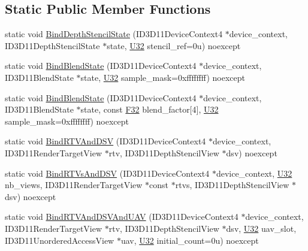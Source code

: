 \subsection*{Static Public Member Functions}
\begin{DoxyCompactItemize}
\item 
static void \hyperlink{structmage_1_1_pipeline_1_1_o_m_a03190c521a1f7b30d12dfdd9bc1ca933}{Bind\+Depth\+Stencil\+State} (I\+D3\+D11\+Device\+Context4 $\ast$device\+\_\+context, I\+D3\+D11\+Depth\+Stencil\+State $\ast$state, \hyperlink{namespacemage_a41c104c036fba3756a74e19f793eeaa1}{U32} stencil\+\_\+ref=0u) noexcept
\item 
static void \hyperlink{structmage_1_1_pipeline_1_1_o_m_a6f753f497555088423b58dea7689b031}{Bind\+Blend\+State} (I\+D3\+D11\+Device\+Context4 $\ast$device\+\_\+context, I\+D3\+D11\+Blend\+State $\ast$state, \hyperlink{namespacemage_a41c104c036fba3756a74e19f793eeaa1}{U32} sample\+\_\+mask=0xffffffff) noexcept
\item 
static void \hyperlink{structmage_1_1_pipeline_1_1_o_m_aec599ec22f8694479158597c5118435b}{Bind\+Blend\+State} (I\+D3\+D11\+Device\+Context4 $\ast$device\+\_\+context, I\+D3\+D11\+Blend\+State $\ast$state, const \hyperlink{namespacemage_aa97e833b45f06d60a0a9c4fc22ae02c0}{F32} blend\+\_\+factor\mbox{[}4\mbox{]}, \hyperlink{namespacemage_a41c104c036fba3756a74e19f793eeaa1}{U32} sample\+\_\+mask=0xffffffff) noexcept
\item 
static void \hyperlink{structmage_1_1_pipeline_1_1_o_m_a6f854210cf5d63f8e2b95c075edb65ed}{Bind\+R\+T\+V\+And\+D\+SV} (I\+D3\+D11\+Device\+Context4 $\ast$device\+\_\+context, I\+D3\+D11\+Render\+Target\+View $\ast$rtv, I\+D3\+D11\+Depth\+Stencil\+View $\ast$dsv) noexcept
\item 
static void \hyperlink{structmage_1_1_pipeline_1_1_o_m_a02b4ded0f2ead8684dc1986a63c613d6}{Bind\+R\+T\+Vs\+And\+D\+SV} (I\+D3\+D11\+Device\+Context4 $\ast$device\+\_\+context, \hyperlink{namespacemage_a41c104c036fba3756a74e19f793eeaa1}{U32} nb\+\_\+views, I\+D3\+D11\+Render\+Target\+View $\ast$const $\ast$rtvs, I\+D3\+D11\+Depth\+Stencil\+View $\ast$dsv) noexcept
\item 
static void \hyperlink{structmage_1_1_pipeline_1_1_o_m_a794a33fcdc6c93ad00abe9ba99e5aa08}{Bind\+R\+T\+V\+And\+D\+S\+V\+And\+U\+AV} (I\+D3\+D11\+Device\+Context4 $\ast$device\+\_\+context, I\+D3\+D11\+Render\+Target\+View $\ast$rtv, I\+D3\+D11\+Depth\+Stencil\+View $\ast$dsv, \hyperlink{namespacemage_a41c104c036fba3756a74e19f793eeaa1}{U32} uav\+\_\+slot, I\+D3\+D11\+Unordered\+Access\+View $\ast$uav, \hyperlink{namespacemage_a41c104c036fba3756a74e19f793eeaa1}{U32} initial\+\_\+count=0u) noexcept

\end{DoxyCompactItemize}
